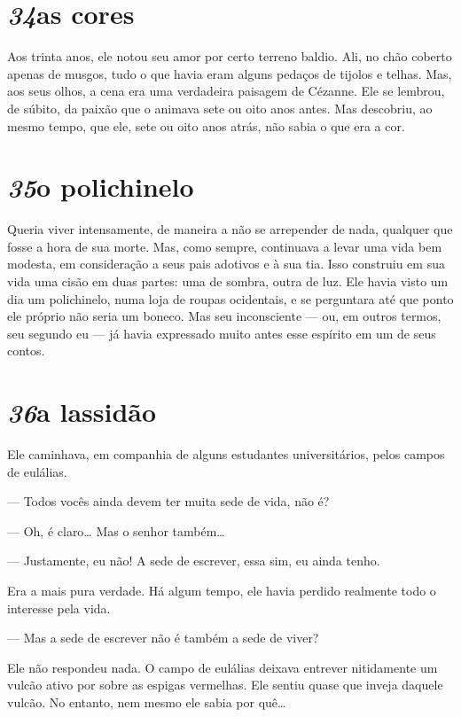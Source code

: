 \section*{\textit{34}\es as cores}

Aos trinta anos, ele notou seu amor por certo terreno baldio. Ali, no
chão coberto apenas de musgos, tudo o que havia eram alguns pedaços de
tijolos e telhas. Mas, aos seus olhos, a cena era uma verdadeira
paisagem de Cézanne. Ele se lembrou, de súbito, da paixão que o animava
sete ou oito anos antes. Mas descobriu, ao mesmo tempo, que ele, sete
ou oito anos atrás, não sabia o que era a cor.

\section*{\textit{35}\es o polichinelo}

Queria viver intensamente, de maneira a não se arrepender de nada,
qualquer que fosse a hora de sua morte. Mas, como sempre, continuava a
levar uma vida bem modesta, em consideração a seus pais adotivos e à
sua tia. Isso construiu em sua vida uma cisão em duas partes: uma de
sombra, outra de luz. Ele havia visto um dia um polichinelo, numa loja
de roupas ocidentais, e se perguntara até que ponto ele próprio não
seria um boneco. Mas seu inconsciente --- ou, em outros termos, seu
segundo eu --- já havia expressado muito antes esse espírito em um de
seus contos.

\section*{\textit{36}\es a lassidão}

Ele caminhava, em companhia de alguns estudantes universitários, pelos
campos de eulálias.

--- Todos vocês ainda devem ter muita sede de vida, não é?

--- Oh, é claro\ldots{} Mas o senhor também\ldots{}

--- Justamente, eu não! A sede de escrever, essa sim, eu ainda tenho.

Era a mais pura verdade. Há algum tempo, ele havia perdido realmente
todo o interesse pela vida.

--- Mas a sede de escrever não é também a sede de viver?

Ele não respondeu nada. O campo de eulálias deixava entrever nitidamente
um vulcão ativo por sobre as espigas vermelhas. Ele sentiu quase que
inveja daquele vulcão. No entanto, nem mesmo ele sabia por quê\ldots{}

